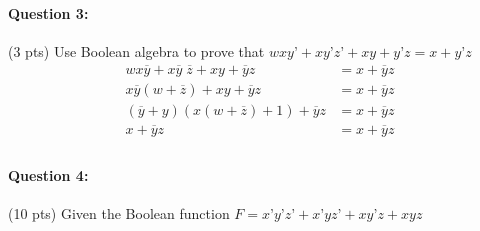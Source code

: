 \documentclass[12pt,letterpaper,titlepage]{report}
\begin{document}
\paragraph{Question 3: }(3 pts) Use Boolean algebra to prove that $wxy’ +xy’z’ + xy + y’z = x + y’z$
\begin{align*}
wx\overline{y} +x\overline{y}\;\overline{z} + xy + \overline{y}z &= x + \overline{y}z\\
x\overline{y}(w+\overline{z}) + xy + \overline{y}z &= x + \overline{y}z\\
(\overline{y}+y)(x(w+\overline{z}) + 1) + \overline{y}z &= x + \overline{y}z\\
x + \overline{y}z &= x + \overline{y}z\\
\end{align*}
\pagebreak
\paragraph{Question 4: } (10 pts) Given the Boolean function $F = x’y’z’+ x’yz’ + xy’z +xyz$ 
\end{document}
